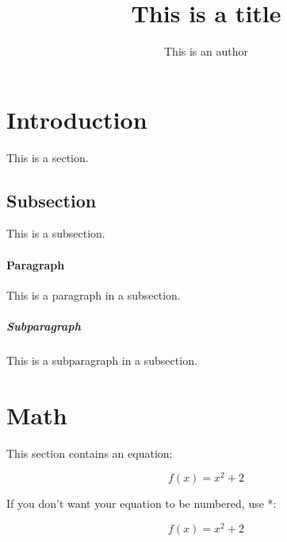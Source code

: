 \documentclass{book}
\title{This is a title}
\author{This is an author}
\date{\vspace{-5ex}}
\begin{document}

\maketitle


\cleardoublepage
\newpage

\doublespacing %
\tableofcontents
\singlespacing %

\cleardoublepage
\newpage

\listoffigures

\cleardoublepage
\newpage

\listoftables

\cleardoublepage
\newpage


\section{Introduction}

This is a section.

\subsection{Subsection}

This is a subsection.

\paragraph{Paragraph} 

This is a paragraph in a subsection.

\subparagraph{Subparagraph} 
 
This is a subparagraph in a subsection.

\section{Math}

This section contains an equation:

\begin{equation}
f(x) = x^2 + 2
\end{equation}

If you don't want your equation to be numbered, use *:

\begin{equation*}
f(x) = x^2 + 2
\end{equation*}
\end{document}
